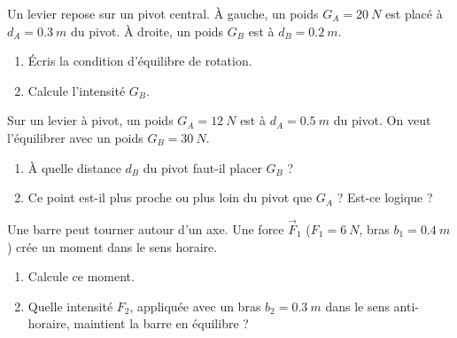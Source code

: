 \documentclass[11pt,a4paper]{article}
\newcommand{\vv}[1]{\vec{#1}}\newcommand{\ds}{\displaystyle}
\begin{document}
\begin{exo}
Un levier repose sur un pivot central. À gauche, un poids $G_A=\qty{20}{N}$ est placé à
$d_A=\qty{0.3}{m}$ du pivot. À droite, un poids $G_B$ est à $d_B=\qty{0.2}{m}$.
\begin{center}
\end{center}
\begin{enumerate}[label=\alph*)]
  \item Écris la condition d'équilibre de rotation.
  \item Calcule l'intensité $G_B$.
\end{enumerate}
\end{exo}

\begin{exo}
Sur un levier à pivot, un poids $G_A=\qty{12}{N}$ est à $d_A=\qty{0.5}{m}$ du pivot. On veut
l'équilibrer avec un poids $G_B=\qty{30}{N}$.
\begin{enumerate}[label=\alph*)]
  \item À quelle distance $d_B$ du pivot faut-il placer $G_B$ ?
  \item Ce point est-il plus proche ou plus loin du pivot que $G_A$ ? Est-ce logique ?
\end{enumerate}
\end{exo}

\begin{exo}
Une barre peut tourner autour d'un axe. Une force $\vv F_1$ ($F_1=\qty{6}{N}$, bras
$b_1=\qty{0.4}{m}$) crée un moment dans le sens horaire.
\begin{enumerate}[label=\alph*)]
  \item Calcule ce moment.
  \item Quelle intensité $F_2$, appliquée avec un bras $b_2=\qty{0.3}{m}$ dans le sens anti-horaire,
        maintient la barre en équilibre ?
\end{enumerate}
\end{exo}
\end{document}
